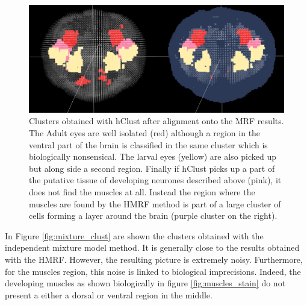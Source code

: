	\begin{figure}[H]
\centerline{\includegraphics[width=\linewidth]{gfx/chapter6/hclust.png}}
\caption{Clusters obtained with hClust after alignment onto the MRF results. The Adult eyes are well isolated (red) although a region in the ventral part of the brain is classified in the same cluster which is biologically nonsensical. The larval eyes (yellow) are also picked up but along side a second region. Finally if hClust picks up a part of the putative tissue of developing neurones described above (pink), it does not find the muscles at all. Instead the region where the muscles are found by the HMRF method is part of a large cluster of cells forming a layer around the brain (purple cluster on the right).}
\label{fig:hclust_clust}
	\end{figure}
	
	In Figure \ref{fig:mixture_clust} are shown the clusters obtained with the independent mixture model method. It is generally close to the results obtained with the HMRF. However, the resulting picture is extremely noisy. Furthermore, for the muscles region, this noise is linked to biological imprecisions. Indeed, the developing muscles as shown biologically in figure \ref{fig:muscles_stain} do not present a either a dorsal or ventral region in the middle. 
	
